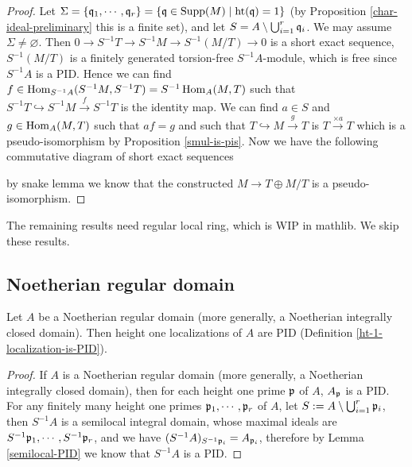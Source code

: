\begin{proof}
Let
$\Sigma=\{{\mathfrak{q}}_1,\cdots,{\mathfrak{q}}_r\}=\{{\mathfrak{q}}\in{\mathrm{Supp}}(M)\mid{\mathrm{ht}}({\mathfrak{q}})=1\}$
(by Proposition \ref{char-ideal-preliminary} this is a finite set),
and let $S=A\setminus\bigcup_{i=1}^r{\mathfrak{q}}_i$.
We may assume $\Sigma\neq\varnothing$.
Then $0\to S^{-1}T\to S^{-1}M\to S^{-1}(M/T)\to 0$ is a short exact sequence,
$S^{-1}(M/T)$ is a finitely generated torsion-free $S^{-1}A$-module,
which is free since $S^{-1}A$ is a PID.
Hence we can find $f\in\operatorname{Hom}_{S^{-1}A}(S^{-1}M,S^{-1}T)=S^{-1}\operatorname{Hom}_A(M,T)$
such that $S^{-1}T\hookrightarrow S^{-1}M\xrightarrow{f}S^{-1}T$
is the identity map.
We can find $a\in S$ and $g\in\operatorname{Hom}_A(M,T)$ such that
$af=g$ and such that $T\hookrightarrow M\xrightarrow{g}T$
is $T\xrightarrow{\times a}T$ which is a pseudo-isomorphism by Proposition \ref{smul-is-pis}.
Now we have the following commutative diagram of short exact sequences
\begin{center}
\end{center}
by snake lemma we know that the constructed $M\to T\oplus M/T$
is a pseudo-isomorphism.
\end{proof}

The remaining results need regular local ring,
which is WIP in mathlib. We skip these results.

\subsection{Noetherian regular domain}

\begin{prop}
\label{regular-domain-is-good}
\leanok
{}
Let $A$ be a Noetherian regular domain
(more generally, a Noetherian integrally closed domain).
Then height one localizations of $A$ are PID
(Definition \ref{ht-1-localization-is-PID}).
\end{prop}

\begin{proof}
\leanok
If $A$ is a Noetherian regular domain
(more generally, a Noetherian integrally closed domain),
then for each height one prime ${\mathfrak{p}}$ of $A$,
$A_{\mathfrak{p}}$ is a PID.
For any finitely many height one primes ${\mathfrak{p}}_1,\cdots,{\mathfrak{p}}_r$ of $A$,
let $S:=A\setminus\bigcup_{i=1}^r{\mathfrak{p}}_i$,
then $S^{-1}A$ is a semilocal integral domain, whose
maximal ideals are $S^{-1}{\mathfrak{p}}_1,\cdots,S^{-1}{\mathfrak{p}}_r$,
and we have $(S^{-1}A)_{S^{-1}{\mathfrak{p}}_i}=A_{{\mathfrak{p}}_i}$,
therefore by Lemma \ref{semilocal-PID} we know that $S^{-1}A$ is a PID.
\end{proof}

